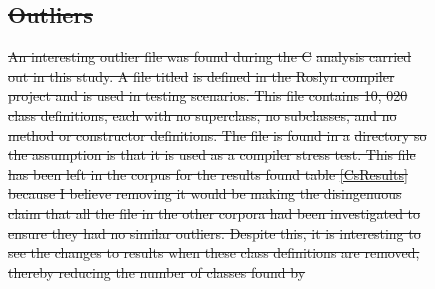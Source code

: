 \documentclass[11pt
              , a4paper
              , twoside
              , openright
              ]{report}
\newcommand{\code}[1]{\lstinline[language=code]{#1}}
\providecommand{\DIFadd}[1]{{\protect\color{blue}\uwave{#1}}} %
\providecommand{\DIFdel}[1]{{\protect\color{red}\sout{#1}}}                      %
\providecommand{\DIFaddbegin}{} %
\providecommand{\DIFaddFL}[1]{\DIFadd{#1}} %
\providecommand{\DIFdelFL}[1]{\DIFdel{#1}} %
\providecommand{\DIFaddbeginFL}{} %
\providecommand{\DIFaddendFL}{} %
\providecommand{\DIFdelbeginFL}{} %
\providecommand{\DIFdelendFL}{} %
\begin{document}
\DIFaddbegin \begin{figure}[H]
	\label{cSharpDistribution}
	\DIFaddendFL \begin{center}
		\DIFdelbeginFL %
\DIFdelendFL 

	\DIFdelbeginFL \subsection{\DIFdelFL{Outliers}}
\addtocounter{subsection}{-1}%
\DIFdelFL{An interesting outlier file was found during the C}%
\DIFdelFL{analysis carried out in this study. A file titled }%
\DIFdelFL{is defined in the Roslyn compiler project and is used in testing scenarios. This file contains 10, 020 class definitions, each with no superclass, no subclasses, and no method or constructor definitions. The file is found in a }%
\DIFdelFL{directory so the assumption is that it is used as a compiler stress test. This file has been left in the corpus for the results found table \ref{CsResults} because I believe removing it would be making the disingenuous claim that all the file in the other corpora had been investigated to ensure they had no similar outliers. Despite this, it is interesting to see the changes to results when these class definitions are removed, thereby reducing the number of classes found by }\DIFdelendFL \DIFaddbeginFL {}
\end{center}
\end{figure}
\end{document}
